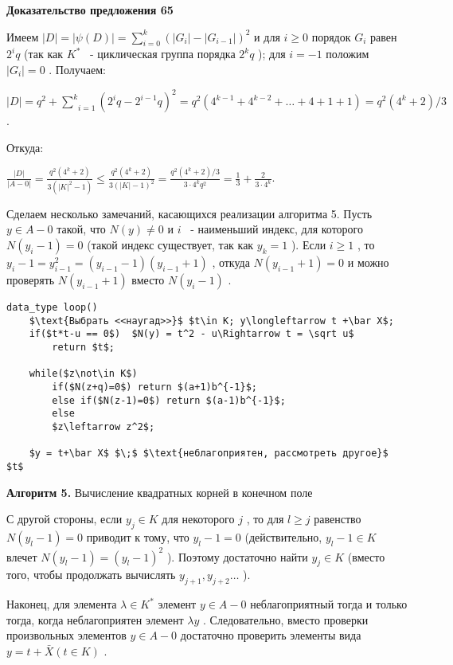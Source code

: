 {\bf Доказательство предложения 65}


Имеем $|D|=|\psi(D)|=\sum_{i=0}^k(|G_i|-|G_{i-1}|)^2$
 и для $i\geqslant 0$
 порядок $G_i$
 равен $2^iq$
 (так как $K^*$
 ~- циклическая группа порядка $2^kq$
 ); для $i=-1$
 положим $|G_i|=0$
 . Получаем:

\begin{center}
$|D|= q^2 + \underset{i=1}{\overset{k}{\sum}}(2^iq-2^{i-1}q)^2 = q^2(4^{k-1}+4^{k-2}+\dots+4+1+1) = q^2(4^k+2)/3$.
\end{center}


Откуда:

\begin{center}
$\frac{|D|}{|A-{0}|} = \frac{q^2(4^k+2)}{3(|K|^2-1)} \leqslant
\frac{q^2(4^k+2)}{3(|K|-1)^2} = \frac{q^2(4^k+2)/3}{3\cdot
4^kq^2} = \frac 13 + \frac{2}{3\cdot
4^k}$.
\end{center}


\newpage

Сделаем несколько замечаний, касающихся реализации алгоритма 5. Пусть $y\in A - {0}$
 такой, что $N(y)\not= 0$
 и $i$
 ~- наименьший индекс, для которого $N(y_i-1)=0$
 (такой индекс существует, так как $y_k=1$
    ). Если $i\geqslant 1$
 , то $y_i-1=y^2_{i-1}=(y_{i-1}-1)(y_{i-1}+1)$
, откуда $N(y_{i-1}+1)=0$
 и можно проверять $N(y_{i-1}+1)$
 вместо $N(y_i-1)$
 .

%
\begin{lstlisting}[mathescape=true]
data_type loop()
    $\text{Выбрать <<наугад>>}$ $t\in K; y\longleftarrow t +\bar X$;
    if($t*t-u == 0$)  $N(y) = t^2 - u\Rightarrow t = \sqrt u$
        return $t$;
    
    while($z\not\in K$) 
        if($N(z+q)=0$) return $(a+1)b^{-1}$;
        else if($N(z-1)=0$) return $(a-1)b^{-1}$;
        else
        $z\leftarrow z^2$;
        
    $y = t+\bar X$ $\;$ $\text{неблагоприятен, рассмотреть другое}$ $t$

\end{lstlisting}


{\bf Алгоритм 5.} Вычисление квадратных корней в конечном поле


С другой стороны, если $y_j\in K$
 для некоторого $j$
 , то для $l\geqslant j$
 равенство $N(y_l -1)=0$
 приводит к тому, что $y_l-1=0$
 (действительно, $y_l-1\in K$
 влечет $N(y_l-1)=(y_l -1)^2$
 ). Поэтому достаточно найти $y_j\in K$
 (вместо того, чтобы продолжать вычислять $y_{j+1},y_{j+2}\ldots$
    ).

Наконец, для элемента $\lambda\in K^*$
 элемент $y\in A - {0}$
 неблагоприятный тогда и только тогда, когда неблагоприятен элемент $ \lambda y$
 . Следовательно, вместо проверки произвольных элементов $y\in A - {0}$
 достаточно проверить элементы вида $y = t + \bar X (t\in K)$
 .

